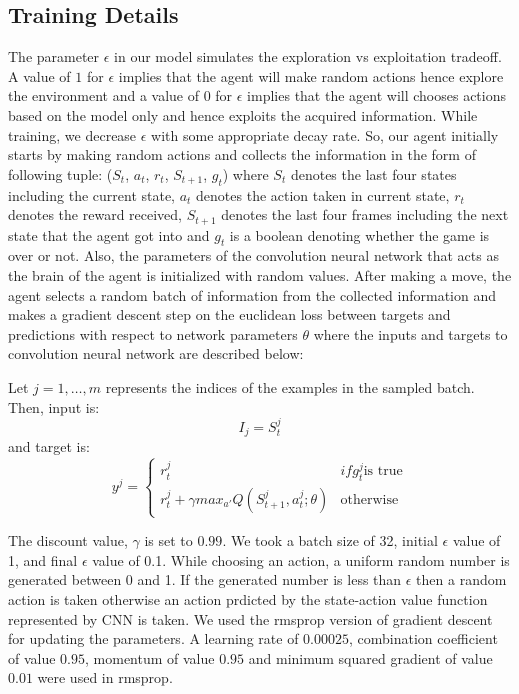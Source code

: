 \documentclass[conference]{IEEEtran}
\begin{document}
\subsection{Training Details}
The parameter $\epsilon$ in our model simulates the exploration vs exploitation tradeoff. A value of $1$ for $\epsilon$ implies that the agent will make random actions hence explore the environment and a value of $0$ for $\epsilon$ implies that the agent will chooses actions based on the model only and hence exploits the acquired information. While training, we decrease $\epsilon$ with some appropriate decay rate. So, our agent initially starts by making random actions and collects the information in the form of following tuple: ($S_{t}$, $a_{t}$, $r_{t}$, $S_{t+1}$, $g_{t}$) where $S_{t}$ denotes the last four states including the current state, $a_{t}$ denotes the action taken in current state, $r_{t}$ denotes the reward received, $S_{t+1}$ denotes the last four frames including the next state that the agent got into and $g_{t}$ is a boolean denoting whether the game is over or not. Also, the parameters of the convolution neural network that acts as the brain of the agent is initialized with random values. After making a move, the agent selects a random batch of information from the collected information and makes a gradient descent step on the euclidean loss between targets and predictions with respect to network parameters $\theta$ where the inputs and targets to convolution neural network are described below:

Let $j=1,…,m$ represents the indices of the examples in the sampled batch.
Then, input is:
\begin{equation} \label{eq:inputI}
I_{j} = S_{t}^{j}
\end{equation}
and target is:
\begin{equation} \label{eq:inputY}
y^{j} = \left\{\begin{matrix}
r_{t}^{j} & if g_{t}^{j} \text{is true}\\ 
r_{t}^{j} + \gamma max_{a'} Q(S_{t+1}^{j}, a_{t}^{j}; \theta)  &\text{otherwise}
\end{matrix}\right.
\end{equation}

The discount value, $\gamma$ is set to $0.99$. We took a batch size of 32, initial $\epsilon$ value of 1, and final $\epsilon$ value of 0.1. While choosing an action, a uniform random number is generated between 0 and 1. If the generated number is less than $\epsilon$ then a random action is taken otherwise an action prdicted by the state-action value function represented by CNN is taken. We used the rmsprop\cite{rmsprop} version of gradient descent for updating the parameters. A learning rate of $0.00025$, combination coefficient of value $0.95$, momentum of value $0.95$ and minimum squared gradient of value $0.01$ were used in rmsprop.
\end{document}
